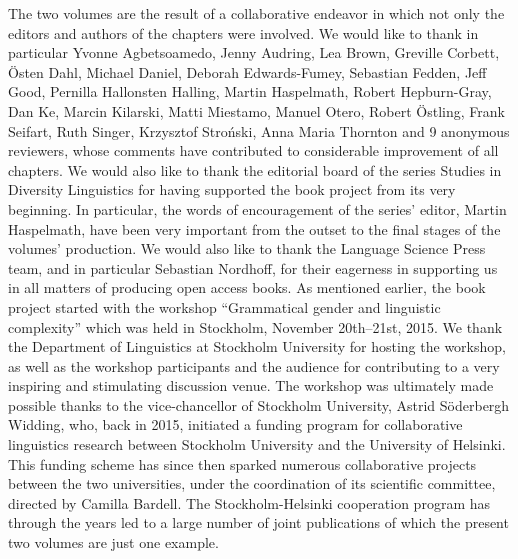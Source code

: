 \documentclass[output=collectionpaper]{langsci/langscibook}
\begin{document}
The two volumes are the result of a collaborative endeavor in which not only the editors and authors of the chapters were involved. We would like to thank in particular Yvonne Agbetsoamedo, Jenny Audring, Lea Brown, Greville Corbett, Östen Dahl, Michael Daniel, Deborah Edwards-Fumey, Sebastian Fedden, Jeff Good, Pernilla Hallonsten Halling, Martin Haspelmath, Robert Hepburn-Gray, Dan Ke, Marcin Kilarski, Matti Miestamo, Manuel Otero, Robert Östling, Frank Seifart, Ruth Singer, Krzysztof Stroński, Anna Maria Thornton and 9 anonymous reviewers, whose comments have contributed to considerable improvement of all chapters. We would also like to thank the editorial board of the series Studies in Diversity Linguistics for having supported the book project from its very beginning. In particular, the words of encouragement of the series’ editor, Martin Haspelmath, have been very important from the outset to the final stages of the volumes’ production. We would also like to thank the Language Science Press team, and in particular Sebastian Nordhoff, for their eagerness in supporting us in all matters of producing open access books. As mentioned earlier, the book project started with the workshop ``Grammatical gender and linguistic complexity'' which was held in Stockholm, November 20th--21st, 2015. We thank the Department of Linguistics at Stockholm University for hosting the workshop, as well as the workshop participants and the audience for contributing to a very inspiring and stimulating discussion venue. The workshop was ultimately made possible thanks to the vice-chancellor of Stockholm University, Astrid Söderbergh Widding, who, back in 2015, initiated a funding program for collaborative linguistics research between Stockholm University and the University of Helsinki. This funding scheme has since then sparked numerous collaborative projects between the two universities, under the coordination of its scientific committee, directed by Camilla Bardell. The Stockholm-Helsinki cooperation program has through the years led to a large number of joint publications of which the present two volumes are just one example.

{\sloppy
\printbibliography[heading=subbibliography,notkeyword=this]
}
\end{document}
